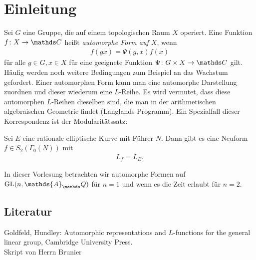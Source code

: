 \chapter*{Einleitung}
Sei $G$ eine Gruppe, die auf einem topologischen Raum $X$ operiert.
Eine Funktion $f\colon X \to \C$ heißt \emph{automorphe Form auf $X$}, wenn
\begin{align*}
f(gx)=  \Psi(g,x) f(x)
\end{align*}
für alle $g\in G,x\in X$ für eine geeignete Funktion $\Psi \colon G \times X \to \C $ gilt.
Häufig werden noch weitere Bedingungen zum Beispiel an das Wachstum gefordert.
Einer automorphen Form kann man eine automorphe Darstellung zuordnen und dieser wiederum eine $L$-Reihe.
Es wird vermutet, dass diese automorphen $L$-Reihen dieselben sind, die man in der arithmetischen algebraischen Geometrie findet (Langlands-Programm).
Ein Spezialfall dieser Korrespondenz ist der Modularitätssatz:
\begin{satz}
Sei $E$ eine rationale elliptische Kurve mit Führer $N$.
Dann gibt es eine Neuform $f\in S_2(\Gamma_0(N))$ mit
\begin{align*}
L_f=L_E.
\end{align*}
\end{satz}
In dieser Vorlesung betrachten wir automorphe Formen auf $\GL(n,\mathds{A}_\Q)$ für $n=1$ und wenn es die Zeit erlaubt für $n=2$.

\section*{Literatur}
Goldfeld, Hundley: Automorphic representations and $L$-functions for the general linear group, Cambridge University Press.\\
Skript von Herrn Brunier